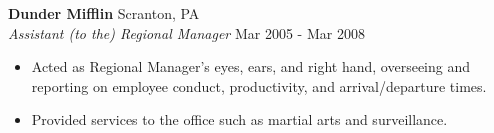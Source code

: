 \textbf{Dunder Mifflin} \hfill Scranton, PA\\
\textit{Assistant (to the) Regional Manager} \hfill Mar 2005 - Mar 2008\\
\vspace{-1mm}
\begin{itemize} \itemsep 1pt
	\item Acted as Regional Manager's eyes, ears, and right hand, overseeing and reporting on employee conduct, productivity, and arrival/departure times.
	\item Provided services to the office such as martial arts and surveillance.
\end{itemize}